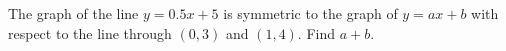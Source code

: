 The graph of the line $y=0.5x+5$ is symmetric to the graph of $y=ax+b$ with respect to the line through $(0,3)$ and $(1,4)$. Find $a+b$.
